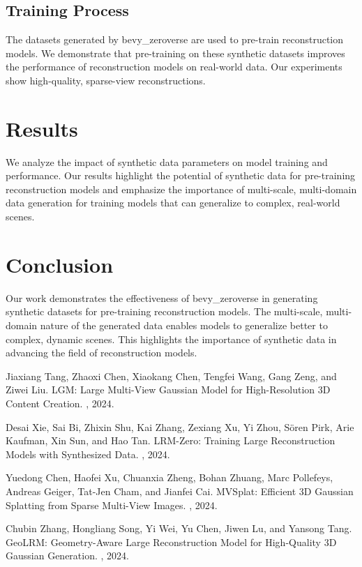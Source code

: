 \documentclass{article}
\begin{document}
\subsection{Training Process}
The datasets generated by bevy\_zeroverse are used to pre-train reconstruction models. We demonstrate that pre-training on these synthetic datasets improves the performance of reconstruction models on real-world data. Our experiments show high-quality, sparse-view reconstructions.

\section{Results}
We analyze the impact of synthetic data parameters on model training and performance. Our results highlight the potential of synthetic data for pre-training reconstruction models and emphasize the importance of multi-scale, multi-domain data generation for training models that can generalize to complex, real-world scenes.

\section{Conclusion}
Our work demonstrates the effectiveness of bevy\_zeroverse in generating synthetic datasets for pre-training reconstruction models. The multi-scale, multi-domain nature of the generated data enables models to generalize better to complex, dynamic scenes. This highlights the importance of synthetic data in advancing the field of reconstruction models.


\begin{thebibliography}{1}

    Jiaxiang Tang, Zhaoxi Chen, Xiaokang Chen, Tengfei Wang, Gang Zeng, and Ziwei Liu.
    \newblock LGM: Large Multi-View Gaussian Model for High-Resolution 3D Content Creation.
    , 2024.

    Desai Xie, Sai Bi, Zhixin Shu, Kai Zhang, Zexiang Xu, Yi Zhou, Sören Pirk, Arie Kaufman, Xin Sun, and Hao Tan.
    \newblock LRM-Zero: Training Large Reconstruction Models with Synthesized Data.
    , 2024.

    Yuedong Chen, Haofei Xu, Chuanxia Zheng, Bohan Zhuang, Marc Pollefeys, Andreas Geiger, Tat-Jen Cham, and Jianfei Cai.
    \newblock MVSplat: Efficient 3D Gaussian Splatting from Sparse Multi-View Images.
    , 2024.

    Chubin Zhang, Hongliang Song, Yi Wei, Yu Chen, Jiwen Lu, and Yansong Tang.
    \newblock GeoLRM: Geometry-Aware Large Reconstruction Model for High-Quality 3D Gaussian Generation.
    , 2024.

\end{thebibliography}
\end{document}
